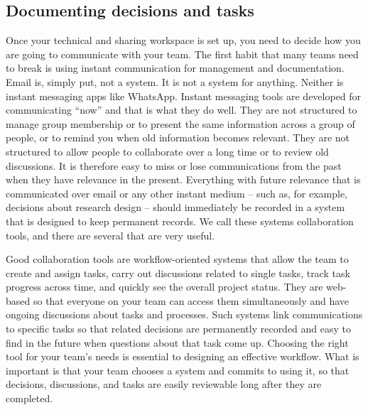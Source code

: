 \subsection{Documenting decisions and tasks}

Once your technical and sharing workspace is set up,
you need to decide how you are going to communicate with your team.
The first habit that many teams need to break
is using instant communication for management and documentation.
Email is, simply put, not a system. It is not a system for anything.
Neither is instant messaging apps like WhatsApp.
Instant messaging tools are developed for communicating ``now'' and that is what they do well.
They are not structured to manage group membership or to present the same information
across a group of people, or to remind you when old information becomes relevant.
They are not structured to allow people to collaborate over a long time or to review old discussions.
It is therefore easy to miss or lose communications from the past when they have relevance in the present.
Everything with future relevance that is communicated over email or any other instant medium
-- such as, for example, decisions about research design --
should immediately be recorded in a system that is designed to keep permanent records.
We call these systems collaboration tools, and there are several that are very useful.

Good collaboration tools are workflow-oriented systems
that allow the team to create and assign tasks,
carry out discussions related to single tasks,
track task progress across time, and quickly see the overall project status.
They are web-based so that everyone on your team can access them simultaneously
and have ongoing discussions about tasks and processes.
Such systems link communications to specific tasks so that
related decisions are permanently recorded
and easy to find in the future when questions about that task come up.
Choosing the right tool for your team's needs is essential to designing an effective workflow.
What is important is that your team chooses a system and commits to using it,
so that decisions, discussions, and tasks are easily reviewable long after they are completed.

